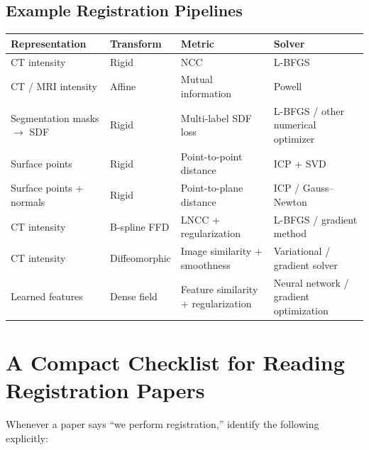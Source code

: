 \documentclass[11pt,a4paper]{article}
\begin{document}
\subsection{Example Registration Pipelines}

\begin{longtable}{p{}p{}p{}p{}}
\toprule
\textbf{Representation} & \textbf{Transform} & \textbf{Metric} & \textbf{Solver}\\
\midrule
CT intensity & Rigid & NCC & L-BFGS\\
CT / MRI intensity & Affine & Mutual information & Powell\\
Segmentation masks $\to$ SDF & Rigid & Multi-label SDF loss & L-BFGS / other numerical optimizer\\
Surface points & Rigid & Point-to-point distance & ICP + SVD\\
Surface points + normals & Rigid & Point-to-plane distance & ICP / Gauss--Newton\\
CT intensity & B-spline FFD & LNCC + regularization & L-BFGS / gradient method\\
CT intensity & Diffeomorphic & Image similarity + smoothness & Variational / gradient solver\\
Learned features & Dense field & Feature similarity + regularization & Neural network / gradient optimization\\
\bottomrule
\end{longtable}

\section{A Compact Checklist for Reading Registration Papers}

Whenever a paper says ``we perform registration,'' identify the following explicitly:
\end{document}
